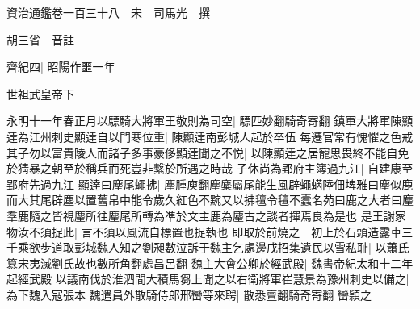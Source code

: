 資治通鑑卷一百三十八　宋　司馬光　撰

胡三省　音註

齊紀四|{
	昭陽作噩一年}


世祖武皇帝下

永明十一年春正月以驃騎大將軍王敬則為司空|{
	驃匹妙翻騎奇寄翻}
鎮軍大將軍陳顯逹為江州刺史顯逹自以門寒位重|{
	陳顯逹南彭城人起於卒伍}
每遷官常有愧懼之色戒其子勿以富貴陵人而諸子多事豪侈顯逹聞之不悦|{
	以陳顯逹之居寵思畏終不能自免於猜暴之朝至於稱兵而死豈非繫於所遇之時哉}
子休尚為郢府主簿過九江|{
	自建康至郢府先過九江}
顯逹曰麈尾蠅拂|{
	麈腫庾翻麈麋屬尾能生風辟蠅蜹陸佃埤雅曰麈似鹿而大其尾辟塵以置舊帛中能令歲久紅色不黦又以拂氊令氊不蠧名苑曰鹿之大者曰麈羣鹿隨之皆視麈所往麈尾所轉為凖於文主鹿為麈古之談者揮焉良為是也}
是王謝家物汝不須捉此|{
	言不須以風流自標置也捉執也}
即取於前燒之　初上於石頭造露車三千乘欲步道取彭城魏人知之劉昶數泣訴于魏主乞處邊戌招集遺民以雪私耻|{
	以蕭氏簒宋夷滅劉氏故也數所角翻處昌呂翻}
魏主大會公卿於經武殿|{
	魏書帝紀太和十二年起經武殿}
以議南伐於淮泗間大積馬芻上聞之以右衛將軍崔慧景為豫州刺史以備之|{
	為下魏入寇張本}
魏遣員外散騎侍郎邢巒等來聘|{
	散悉亶翻騎奇寄翻}
巒頴之

